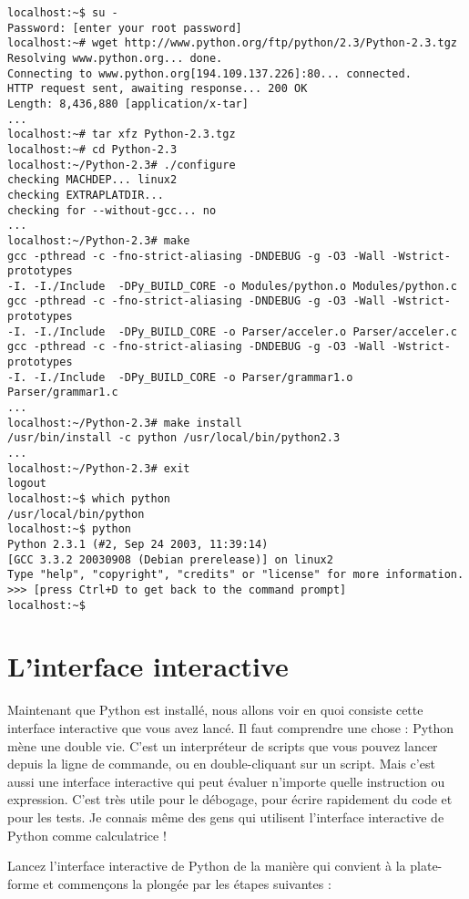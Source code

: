 \begin{lstlisting}
localhost:~$ su -
Password: [enter your root password]
localhost:~# wget http://www.python.org/ftp/python/2.3/Python-2.3.tgz
Resolving www.python.org... done.
Connecting to www.python.org[194.109.137.226]:80... connected.
HTTP request sent, awaiting response... 200 OK
Length: 8,436,880 [application/x-tar]
...
localhost:~# tar xfz Python-2.3.tgz
localhost:~# cd Python-2.3
localhost:~/Python-2.3# ./configure
checking MACHDEP... linux2
checking EXTRAPLATDIR...
checking for --without-gcc... no
...
localhost:~/Python-2.3# make
gcc -pthread -c -fno-strict-aliasing -DNDEBUG -g -O3 -Wall -Wstrict-prototypes
-I. -I./Include  -DPy_BUILD_CORE -o Modules/python.o Modules/python.c
gcc -pthread -c -fno-strict-aliasing -DNDEBUG -g -O3 -Wall -Wstrict-prototypes
-I. -I./Include  -DPy_BUILD_CORE -o Parser/acceler.o Parser/acceler.c
gcc -pthread -c -fno-strict-aliasing -DNDEBUG -g -O3 -Wall -Wstrict-prototypes
-I. -I./Include  -DPy_BUILD_CORE -o Parser/grammar1.o Parser/grammar1.c
...
localhost:~/Python-2.3# make install
/usr/bin/install -c python /usr/local/bin/python2.3
...
localhost:~/Python-2.3# exit
logout
localhost:~$ which python
/usr/local/bin/python
localhost:~$ python
Python 2.3.1 (#2, Sep 24 2003, 11:39:14)
[GCC 3.3.2 20030908 (Debian prerelease)] on linux2
Type "help", "copyright", "credits" or "license" for more information.
>>> [press Ctrl+D to get back to the command prompt]
localhost:~$
\end{lstlisting}

\section{L'interface interactive}\label{L'interface interactive}

Maintenant que Python est installé, nous allons voir en quoi consiste cette interface interactive que vous avez lancé.
Il faut comprendre une chose : Python mène une double vie. C'est un interpréteur de scripts que vous pouvez lancer depuis la ligne de commande, ou en double-cliquant sur un script. Mais c'est aussi une interface interactive qui peut évaluer n'importe quelle instruction ou expression. C'est très utile pour le débogage, pour écrire rapidement du code et pour les tests. Je connais même des gens qui utilisent l'interface interactive de Python comme calculatrice !

Lancez l'interface interactive de Python de la manière qui convient à la plate-forme et commençons la plongée par les étapes suivantes :

